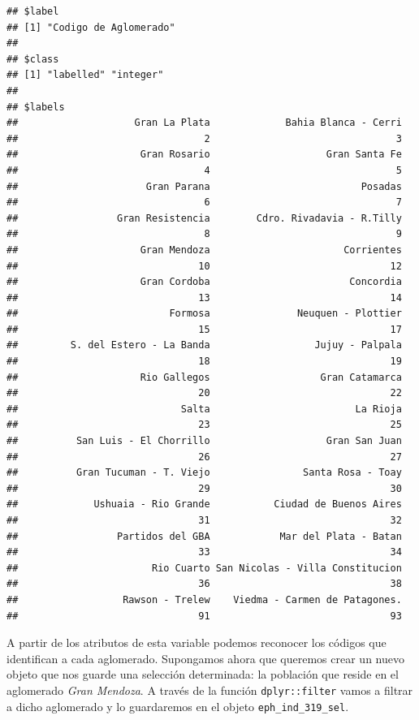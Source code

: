 \documentclass[
]{book}
\begin{document}
\begin{verbatim}
## $label
## [1] "Codigo de Aglomerado"
## 
## $class
## [1] "labelled" "integer" 
## 
## $labels
##                    Gran La Plata             Bahia Blanca - Cerri 
##                                2                                3 
##                     Gran Rosario                    Gran Santa Fe 
##                                4                                5 
##                      Gran Parana                          Posadas 
##                                6                                7 
##                 Gran Resistencia        Cdro. Rivadavia - R.Tilly 
##                                8                                9 
##                     Gran Mendoza                       Corrientes 
##                               10                               12 
##                     Gran Cordoba                        Concordia 
##                               13                               14 
##                          Formosa               Neuquen - Plottier 
##                               15                               17 
##         S. del Estero - La Banda                  Jujuy - Palpala 
##                               18                               19 
##                     Rio Gallegos                   Gran Catamarca 
##                               20                               22 
##                            Salta                         La Rioja 
##                               23                               25 
##          San Luis - El Chorrillo                    Gran San Juan 
##                               26                               27 
##          Gran Tucuman - T. Viejo                Santa Rosa - Toay 
##                               29                               30 
##             Ushuaia - Rio Grande           Ciudad de Buenos Aires 
##                               31                               32 
##                 Partidos del GBA            Mar del Plata - Batan 
##                               33                               34 
##                       Rio Cuarto San Nicolas - Villa Constitucion 
##                               36                               38 
##                  Rawson - Trelew    Viedma - Carmen de Patagones. 
##                               91                               93
\end{verbatim}

A partir de los atributos de esta variable podemos reconocer los códigos que identifican a cada aglomerado. Supongamos ahora que queremos crear un nuevo objeto que nos guarde una selección determinada: la población que reside en el aglomerado \emph{Gran Mendoza}. A través de la función \texttt{dplyr::filter} vamos a filtrar a dicho aglomerado y lo guardaremos en el objeto \texttt{eph\_ind\_319\_sel}.
\end{document}
